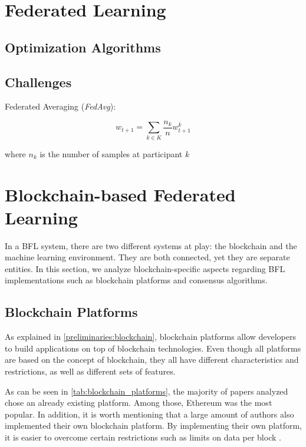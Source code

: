 \section{Federated Learning}

\subsection{Optimization Algorithms}

\subsection{Challenges}

Federated Averaging (\textit{FedAvg}):

\begin{equation}
w_{t+1} = \sum_{k \in K} \frac{n_k}{n} w_{t+1}^k
\end{equation}

where $n_k$ is the number of samples at participant $k$

\section{Blockchain-based Federated Learning}

In a BFL system, there are two different systems at play: the blockchain and the machine learning environment. They are both connected, yet they are separate entities. In this section, we analyze blockchain-specific aspects regarding BFL implementations such as blockchain platforms and consensus algorithms.

\subsection{Blockchain Platforms}

As explained in \autoref{preliminaries:blockchain}, blockchain platforms allow developers to build applications on top of blockchain technologies. Even though all platforms are based on the concept of blockchain, they all have different characteristics and restrictions, as well as different sets of features.

As can be seen in \autoref{tab:blockchain_platforms}, the majority of papers analyzed chose an already existing platform. Among those, Ethereum was the most popular. In addition, it is worth mentioning that a large amount of authors also implemented their own blockchain platform. By implementing their own platform, it is easier to overcome certain restrictions such as limits on data per block \cite{8733825, 9524833}.

